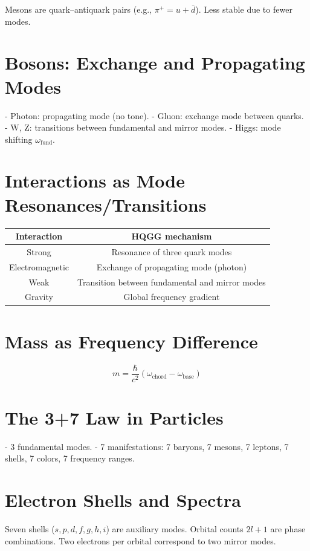 \documentclass[12pt,a4paper]{article}
\begin{document}
Mesons are quark–antiquark pairs (e.g., \(\pi^+ = u + \bar{d}\)). Less stable due to fewer modes.

\section{Bosons: Exchange and Propagating Modes}

- Photon: propagating mode (no tone).
- Gluon: exchange mode between quarks.
- W, Z: transitions between fundamental and mirror modes.
- Higgs: mode shifting \(\omega_{\text{fund}}\).

\section{Interactions as Mode Resonances/Transitions}

\begin{tabular}{c|c}
\textbf{Interaction} & \textbf{HQGG mechanism} \\
\hline
Strong & Resonance of three quark modes \\
Electromagnetic & Exchange of propagating mode (photon) \\
Weak & Transition between fundamental and mirror modes \\
Gravity & Global frequency gradient \\
\end{tabular}

\section{Mass as Frequency Difference}

\[
m = \frac{\hbar}{c^2} \left( \omega_{\text{chord}} - \omega_{\text{base}} \right)
\]

\section{The 3+7 Law in Particles}

- 3 fundamental modes.
- 7 manifestations: 7 baryons, 7 mesons, 7 leptons, 7 shells, 7 colors, 7 frequency ranges.

\section{Electron Shells and Spectra}

Seven shells (\(s, p, d, f, g, h, i\)) are auxiliary modes. Orbital counts \(2l+1\) are phase combinations. Two electrons per orbital correspond to two mirror modes.
\end{document}
